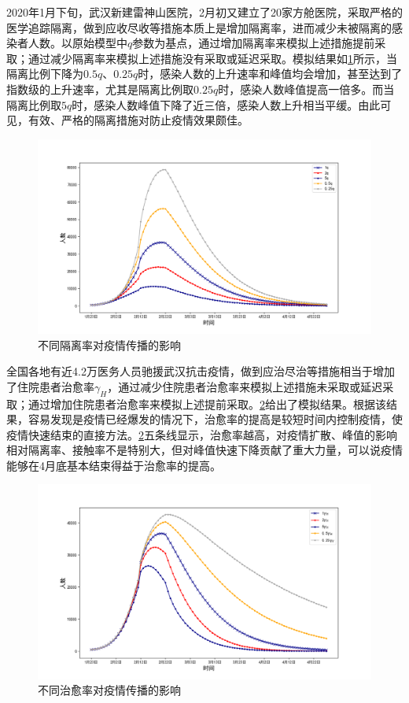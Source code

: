 \documentclass[withoutpre]{cumcmthesis} %
\begin{document}
2020年1月下旬，武汉新建雷神山医院，2月初又建立了20家方舱医院，采取严格的医学追踪隔离，做到应收尽收等措施本质上是增加隔离率，进而减少未被隔离的感染者人数。以原始模型中$q$参数为基点，通过增加隔离率来模拟上述措施提前采取；通过减少隔离率来模拟上述措施没有采取或延迟采取。模拟结果如\cref{fig:h}所示，当隔离比例下降为$0.5q$、$0.25q$时，感染人数的上升速率和峰值均会增加，甚至达到了指数级的上升速率，尤其是隔离比例取$0.25q$时，感染人数峰值提高一倍多。而当隔离比例取$5q$时，感染人数峰值下降了近三倍，感染人数上升相当平缓。由此可见，有效、严格的隔离措施对防止疫情效果颇佳。
\begin{figure}[!h]
    \centering
    \includegraphics[width=1.0\textwidth]{figures/q.png}
    \caption{不同隔离率对疫情传播的影响}
    \label{fig:h}
\end{figure}


全国各地有近4.2万医务人员驰援武汉抗击疫情，做到应治尽治等措施相当于增加了住院患者治愈率$\gamma_H$，通过减少住院患者治愈率来模拟上述措施未采取或延迟采取；通过增加住院患者治愈率来模拟上述提前采取。\cref{fig:gamma}给出了模拟结果。根据该结果，容易发现是疫情已经爆发的情况下，治愈率的提高是较短时间内控制疫情，使疫情快速结束的直接方法。\cref{fig:gamma}五条线显示，治愈率越高，对疫情扩散、峰值的影响相对隔离率、接触率不是特别大，但对峰值快速下降贡献了重大力量，可以说疫情能够在4月底基本结束得益于治愈率的提高。

\begin{figure}[!h]
    \centering
    \includegraphics[width=1.0\textwidth]{figures/yh.png}
    \caption{不同治愈率对疫情传播的影响}
    \label{fig:gamma}
\end{figure}
\end{document}
